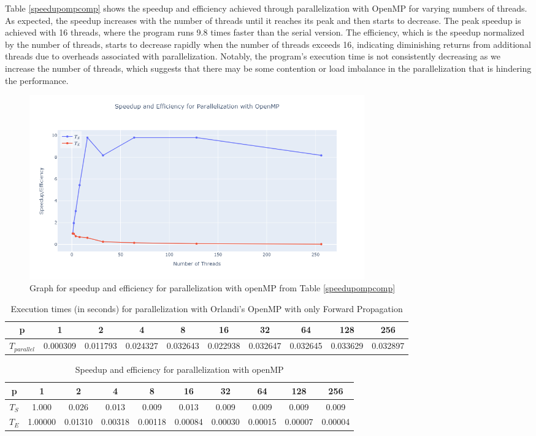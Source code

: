 \documentclass[11pt]{article}
\begin{document}
Table \ref{speedupompcomp} shows the speedup and efficiency achieved through parallelization with OpenMP for varying numbers of threads. As expected, the speedup increases with the number of threads until it reaches its peak and then starts to decrease. The peak speedup is achieved with 16 threads, where the program runs 9.8 times faster than the serial version. The efficiency, which is the speedup normalized by the number of threads, starts to decrease rapidly when the number of threads exceeds 16, indicating diminishing returns from additional threads due to overheads associated with parallelization. Notably, the program's execution time is not consistently decreasing as we increase the number of threads, which suggests that there may be some contention or load imbalance in the parallelization that is hindering the performance.

\begin{figure}[H]
    \centering
    \includegraphics[width=0.7\textwidth]{Plots/speedup_omp_comp.png}
    \caption{Graph for speedup and efficiency for parallelization with openMP from Table \ref{speedupompcomp}}
    \label{fig:speedup_omp_comp}
\end{figure}


\bigskip 

\begin{table}[H]
\centering
\begin{tabular}{|c|c|c|c|c|c|c|c|c|c|}
\hline
 p & 1 & 2 & 4 & 8 & 16 & 32 & 64 & 128 & 256 \\ \hline
 $T_{parallel}$ & 0.000309 & 0.011793 & 0.024327 & 0.032643 & 0.022938 & 0.032647 & 0.032645 & 0.033629 & 0.032897  \\ \hline
\end{tabular}
\caption{Execution times (in seconds) for parallelization with Orlandi's OpenMP with only Forward Propagation} \label{timeOrlandiOpenMPcomparision}
\end{table}

\begin{table}[H]
\centering
\begin{tabular}{|c|c|c|c|c|c|c|c|c|c|}
\hline
 p      & 1 & 2 & 4 & 8 & 16 & 32 & 64 & 128 & 256 \\ \hline
 $T_{S}$ & 1.000 & 0.026 & 0.013 & 0.009 & 0.013 & 0.009 & 0.009 & 0.009 & 0.009 \\ \hline
 $T_{E}$  & 1.00000 & 0.01310 & 0.00318 & 0.00118 & 0.00084 & 0.00030 & 0.00015 & 0.00007 & 0.00004 \\ \hline
\end{tabular}
\caption{Speedup and efficiency for parallelization with openMP} \label{speedupompcomporlandi}
\end{table}
\end{document}
